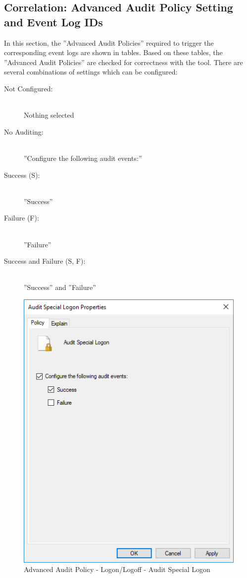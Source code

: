 \subsection{Correlation: Advanced Audit Policy Setting and Event Log IDs}\label{Correlation}
In this section, the ''Advanced Audit Policies'' required to trigger the corresponding event logs are shown in tables. Based on these tables, the ''Advanced Audit Policies'' are checked for correctness with the tool. There are several combinations of settings which can be configured:\\
\begin{multicols}{2}
    \vspace{1cm} \null 
    \begin{description}
        \item[Not Configured:] \ \\ Nothing selected
        \item[No Auditing:] \ \\ ''Configure the following audit events:''
        \item[Success (S):] \ \\ ''Success''
        \item[Failure (F):] \ \\ ''Failure''
        \item[Success and Failure (S, F):] \ \\ ''Success'' and ''Failure'' 
    \end{description}
    \vfill \null 
    \columnbreak

    \begin{figure}[H]
        \centering
        \includegraphics[width=0.75\linewidth]{assets/auditpolicies/speciallogon.png}
        \caption{Advanced Audit Policy - Logon/Logoff - Audit Special Logon}
    \end{figure}
\end{multicols}
